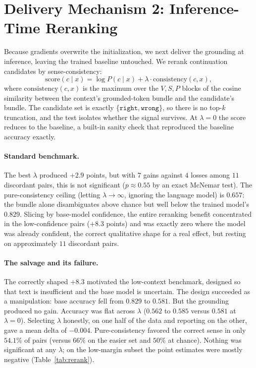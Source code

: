 \documentclass[twoside,11pt]{article}
\begin{document}
\section{Delivery Mechanism 2: Inference-Time Reranking}
\label{sec:rerank}

Because gradients overwrite the initialization, we next deliver the grounding at inference, leaving the trained baseline untouched. We rerank continuation candidates by sense-consistency:
\begin{equation}
\mathrm{score}(c \mid x) = \log P(c \mid x) + \lambda \cdot \mathrm{consistency}(c, x),
\end{equation}
where $\mathrm{consistency}(c,x)$ is the maximum over the $V, S, P$ blocks of the cosine similarity between the context's grounded-token bundle and the candidate's bundle. The candidate set is exactly $\{\texttt{right}, \texttt{wrong}\}$, so there is no top-$k$ truncation, and the test isolates whether the signal survives. At $\lambda = 0$ the score reduces to the baseline, a built-in sanity check that reproduced the baseline accuracy exactly.

\paragraph{Standard benchmark.}
The best $\lambda$ produced $+2.9$ points, but with $7$ gains against $4$ losses among $11$ discordant pairs, this is not significant ($p \approx 0.55$ by an exact McNemar test). The pure-consistency ceiling (letting $\lambda \to \infty$, ignoring the language model) is $0.657$: the bundle alone disambiguates above chance but well below the trained model's $0.829$. Slicing by base-model confidence, the entire reranking benefit concentrated in the low-confidence pairs ($+8.3$ points) and was exactly zero where the model was already confident, the correct qualitative shape for a real effect, but resting on approximately $11$ discordant pairs.

\paragraph{The salvage and its failure.}
The correctly shaped $+8.3$ motivated the low-context benchmark, designed so that text is insufficient and the base model is uncertain. The design succeeded as a manipulation: base accuracy fell from $0.829$ to $0.581$. But the grounding produced no gain. Accuracy was flat across $\lambda$ ($0.562$ to $0.585$ versus $0.581$ at $\lambda=0$). Selecting $\lambda$ honestly, on one half of the data and reporting on the other, gave a mean delta of $-0.004$. Pure-consistency favored the correct sense in only $54.1\%$ of pairs (versus $66\%$ on the easier set and $50\%$ at chance). Nothing was significant at any $\lambda$; on the low-margin subset the point estimates were mostly negative (Table~\ref{tab:rerank}).
\end{document}
